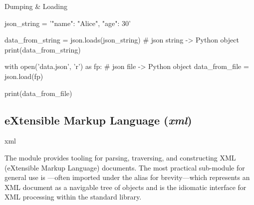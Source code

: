 \documentclass[10pt]{article}
\begin{document}
\begin{core}{Dumping \& Loading}
\begin{enumerate}
\begin{pyconsole}
          json_string = '{"name": "Alice", "age": 30}'

          data_from_string = json.loads(json_string) # json string -> Python object
          print(data_from_string)  

          with open('data.json', 'r') as fp: # json file -> Python object
              data_from_file = json.load(fp)

          print(data_from_file)

        \end{pyconsole}

      \end{enumerate}

    \end{core}

  \subsection{eXtensible Markup Language (\textit{xml})}

    \begin{core}{xml}

      The  module provides tooling for parsing, traversing, and constructing XML (eXtensible Markup Language) documents. The most practical sub-module for general use is ---often imported under the alias  for brevity---which represents an XML document as a navigable tree of  objects and is the idiomatic interface for XML processing within the standard library.

    \end{core}
\end{document}
